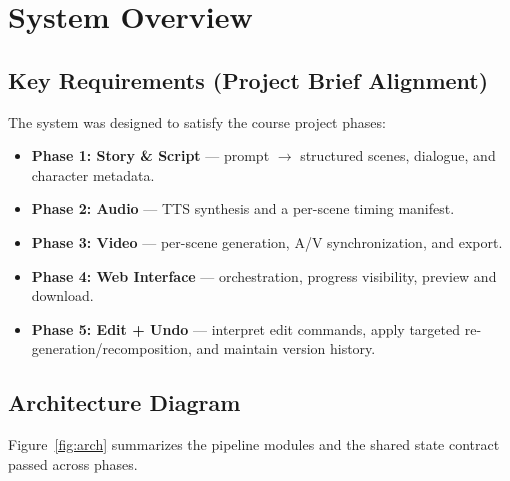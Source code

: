 \documentclass[runningheads]{llncs}
\begin{document}
\section{System Overview}
\subsection{Key Requirements (Project Brief Alignment)}
The system was designed to satisfy the course project phases:
\begin{itemize}
  \item \textbf{Phase 1: Story \& Script} --- prompt $\rightarrow$ structured scenes, dialogue, and character metadata.
  \item \textbf{Phase 2: Audio} --- TTS synthesis and a per-scene timing manifest.
  \item \textbf{Phase 3: Video} --- per-scene generation, A/V synchronization, and export.
  \item \textbf{Phase 4: Web Interface} --- orchestration, progress visibility, preview and download.
  \item \textbf{Phase 5: Edit + Undo} --- interpret edit commands, apply targeted re-generation/recomposition, and maintain version history.
\end{itemize}

\subsection{Architecture Diagram}
Figure~\ref{fig:arch} summarizes the pipeline modules and the shared state contract passed across phases.
\end{document}
